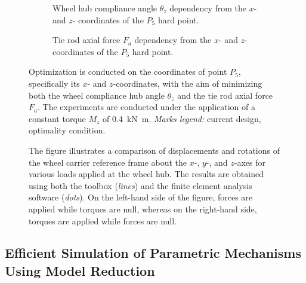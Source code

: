 \begin{figure}[htb]
  \centering
    \begin{subfigure}[t]{0.49\textwidth}
    \small{}
    \caption{Wheel hub compliance angle $\theta_z$ dependency from the $x$- and $z$- coordinates of the $P_5$ hard point.}
    \label{app4:fig:variation_theta_z}
  \end{subfigure}
  \hfill
  \begin{subfigure}[t]{0.49\textwidth}
    \centering
    \small{}
    \caption{Tie rod axial force $F_a$ dependency from the $x$- and $z$- coordinates of the $P_5$ hard point.}
    \label{app4:fig:variation_force_tie}
  \end{subfigure}
  \caption{Optimization is conducted on the coordinates of point $P_5$, specifically its $x$- and $z$-coordinates, with the aim of minimizing both the wheel compliance hub angle $\theta_z$ and the tie rod axial force $F_a$. The experiments are conducted under the application of a constant torque $M_z$ of \SI{0.4}{\kilo\newton\meter}. \emph{Marks legend:} {\color{mycolor2}\raisebox{-.15pt}{\Large$\bullet$}} current design, {\color{mycolor5}\raisebox{-.15pt}{\Large$\bullet$}} optimality condition.}
  \label{app4:fig:optimization}
\end{figure}

\begin{figure}[htp!]
  \centering
  \small{}
  \caption{The figure illustrates a comparison of displacements and rotations of the wheel carrier reference frame about the $x$-, $y$-, and $z$-axes for various loads applied at the wheel hub. The results are obtained using both the \TrussMe{} toolbox (\emph{lines}) and the \Ansys{} finite element analysis software (\emph{dots}). On the left-hand side of the figure, forces are applied while torques are null, whereas on the right-hand side, torques are applied while forces are null.}
  \label{app4:fig:suspension_static_results}
\end{figure}

\subsection{Efficient Simulation of Parametric Mechanisms Using Model Reduction}

